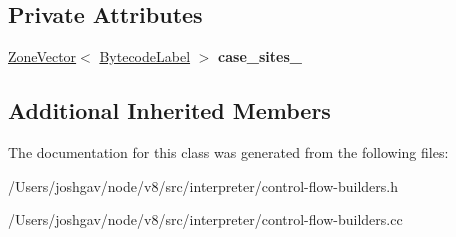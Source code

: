 \subsection*{Private Attributes}
\begin{DoxyCompactItemize}
\item 
\hyperlink{classv8_1_1internal_1_1_zone_vector}{Zone\+Vector}$<$ \hyperlink{classv8_1_1internal_1_1interpreter_1_1_bytecode_label}{Bytecode\+Label} $>$ {\bfseries case\+\_\+sites\+\_\+}\hypertarget{classv8_1_1internal_1_1interpreter_1_1_switch_builder_ad1b0317c0a471057cff19e0c3cdf18e5}{}\label{classv8_1_1internal_1_1interpreter_1_1_switch_builder_ad1b0317c0a471057cff19e0c3cdf18e5}

\end{DoxyCompactItemize}
\subsection*{Additional Inherited Members}


The documentation for this class was generated from the following files\+:\begin{DoxyCompactItemize}
\item 
/\+Users/joshgav/node/v8/src/interpreter/control-\/flow-\/builders.\+h\item 
/\+Users/joshgav/node/v8/src/interpreter/control-\/flow-\/builders.\+cc\end{DoxyCompactItemize}
